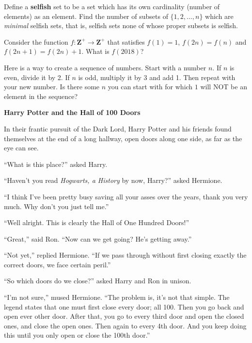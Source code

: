 \documentclass[11pt]{exam}
\def\Z{\mathbf{Z}}
\begin{document}
\begin{questions}
\question Define a \textbf{selfish} set to be a set which has its own cardinality (number of elements) as an element.  Find the number of subsets of $\{1, 2, \ldots, n\}$ which are \emph{minimal} selfish sets, that is, selfish sets none of whose proper subsets is selfish.

\question Consider the function $f:\Z^+ \to \Z^+$ that satisfies $f(1) = 1$, $f(2n) = f(n)$ and $f(2n+1) = f(2n)+1$.  What is $f(2018)$?

\question Here is a way to create a sequence of numbers.  Start with a number $n$.  If $n$ is even, divide it by 2.  If $n$ is odd, multiply it by 3 and add 1.  Then repeat with your new number.  Is there some $n$ you can start with for which $1$ will NOT be an element in the sequence?





  \clearpage

  \begin{center}
   {\bf \Large Harry Potter and the Hall of 100 Doors}
  \end{center}


  In their frantic pursuit of the Dark Lord, Harry Potter and his friends found themselves at the end of a long hallway, open doors along one side, as far as the eye can see.

  ``What is this place?'' asked Harry.

  ``Haven't you read {\it Hogwarts, a History} by now, Harry?'' asked Hermione.

  ``I think I've been pretty busy saving all your asses over the years, thank you very much.  Why don't you just tell me.''

  ``Well alright.  This is clearly the Hall of One Hundred Doors!''

  ``Great,'' said Ron.  ``Now can we get going?  He's getting away.''

  ``Not yet,'' replied Hermione. ``If we pass through without first closing exactly the correct doors, we face certain peril.''

  ``So which doors do we close?'' asked Harry and Ron in unison.

  ``I'm not sure,'' mused Hermione.  ``The problem is, it's not that simple.  The legend states that one must first close every door; all 100.  Then you go back and open ever other door.  After that, you go to every third door and open the closed ones, and close the open ones.  Then again to every 4th door.  And you keep doing this until you only open or close the 100th door.''


\end{questions}
\end{document}
